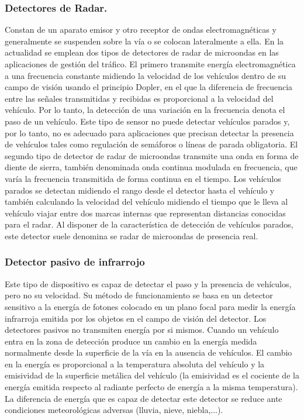 \subsubsection{Detectores de Radar.}
Constan de un aparato emisor y otro receptor de ondas electromagnéticas y generalmente se suspenden sobre la vía o se colocan 
lateralmente a ella. En la actualidad se emplean dos tipos de detectores de radar de microondas en las aplicaciones de 
gestión del tráfico. 
El primero transmite energía electromagnética a una frecuencia constante midiendo la velocidad de los vehículos dentro de su 
campo de visión usando el principio Dopler, en el que la diferencia de frecuencia entre las señales transmitidas y recibidas 
es proporcional a la velocidad del vehículo. Por lo tanto, la detección de una variación en la frecuencia denota el paso de un vehículo. 
Este tipo de sensor no puede detectar vehículos parados y, por lo tanto, no es adecuado para aplicaciones que precisan detectar 
la presencia de vehículos tales como regulación de semáforos o líneas de parada obligatoria. 
El segundo tipo de detector de radar de microondas transmite una onda en forma de diente de sierra, también denominada onda continua 
modulada en frecuencia, que varía la frecuencia transmitida de forma continua en el tiempo. Los vehículos parados se detectan midiendo 
el rango desde el detector hasta el vehículo y también calculando la velocidad del vehículo midiendo el tiempo que le lleva al vehículo 
viajar entre dos marcas internas que representan distancias conocidas para el radar. Al disponer de la característica de detección de 
vehículos parados, este detector suele denomina se radar de microondas de presencia real\cite{14}.
\subsubsection{Detector pasivo de infrarrojo}
Este tipo de dispositivo es capaz de detectar el paso y la presencia de vehículos, pero no su velocidad. 
Su método de funcionamiento se basa en un detector sensitivo a la energía de fotones colocado en un plano focal para medir la energía 
infrarroja emitida por los objetos en el campo de visión del detector. Los detectores pasivos no transmiten energía por si mismos. 
Cuando un vehículo entra en la zona de detección produce un cambio en la energía medida normalmente desde la superficie de la vía en 
la ausencia de vehículos. El cambio en la energía es proporcional a la temperatura absoluta del vehículo y la emisividad de la 
superficie metálica del vehículo (la emisividad es el cociente de la energía emitida respecto al radiante perfecto de energía a la misma 
temperatura). 
La diferencia de energía que es capaz de detectar este detector se reduce ante condiciones meteorológicas adversas 
(lluvia, nieve, niebla,...)\cite{14}.
